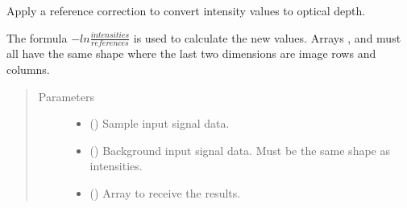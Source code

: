 \documentclass[letterpaper,10pt,english]{sphinxmanual}
\begin{document}
\begin{fulllineitems}
\label{\detokenize{xanespy:xanespy.xanes_math.apply_references}}
Apply a reference correction to convert intensity values to optical
depth.

The formula \(-ln\frac{intensities}{references}\) is used to
calculate the new values. Arrays , 
and  must all have the same shape where the last two
dimensions are image rows and columns.
\begin{quote}\begin{description}
\item[{Parameters}] \leavevmode\begin{itemize}
\item {} 
 () \textendash{} Sample input signal data.

\item {} 
 () \textendash{} Background input signal data. Must be the same shape as
intensities.

\item {} 
 (\sphinxstyleliteralemphasis{, }) \textendash{} Array to receive the results.

\end{itemize}

\end{description}\end{quote}

\end{fulllineitems}

\end{document}
